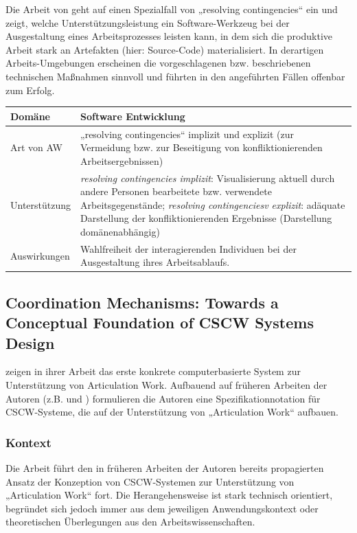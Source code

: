 Die Arbeit von \citet{Grinter96} geht auf einen Spezialfall von „resolving contingencies“ ein und zeigt, welche Unterstützungsleistung ein Software-Werkzeug bei der Ausgestaltung eines Arbeitsprozesses leisten kann, in dem sich die produktive Arbeit stark an Artefakten (hier: Source-Code) materialisiert. In derartigen Arbeits-Umgebungen erscheinen die vorgeschlagenen bzw. beschriebenen technischen Maßnahmen sinnvoll und führten in den angeführten Fällen offenbar zum Erfolg.
\\[1em]
\begin{tabular}{| p{3cm} | p{10cm} |}
  \hline
  Domäne & Software Entwicklung \\ \hline
  Art von AW & „resolving contingencies“ implizit und explizit (zur Vermeidung bzw. zur Beseitigung von konfliktionierenden Arbeitsergebnissen) \\ \hline
  Unterstützung & \emph{resolving contingencies implizit}: Visualisierung aktuell durch andere Personen bearbeitete bzw. verwendete Arbeitsgegenstände; \emph{resolving contingenciesv explizit}: adäquate Darstellung der konfliktionierenden Ergebnisse (Darstellung domänenabhängig) \\ \hline
  Auswirkungen & Wahlfreiheit der interagierenden Individuen bei der Ausgestaltung ihres Arbeitsablaufs.\\ \hline
\end{tabular}

\subsection{Coordination Mechanisms: Towards a Conceptual Foundation of CSCW Systems Design}

\citet{Schmidt96} zeigen in ihrer Arbeit das erste konkrete computerbasierte System zur Unterstützung von Articulation Work. Aufbauend auf früheren Arbeiten der Autoren (z.B. \citep{Schmidt90} und \citep{Schmidt92}) formulieren die Autoren eine Spezifikationnotation für \gls{CSCW}-Systeme, die auf der Unterstützung von „Articulation Work“ aufbauen.

\subsubsection{Kontext}

Die Arbeit führt den in früheren Arbeiten der Autoren bereits propagierten Ansatz der Konzeption von \gls{CSCW}-Systemen zur Unterstützung von „Articulation Work“ fort. Die Herangehensweise ist stark technisch orientiert, begründet sich jedoch immer aus dem jeweiligen Anwendungskontext oder theoretischen Überlegungen aus den Arbeitswissenschaften.

